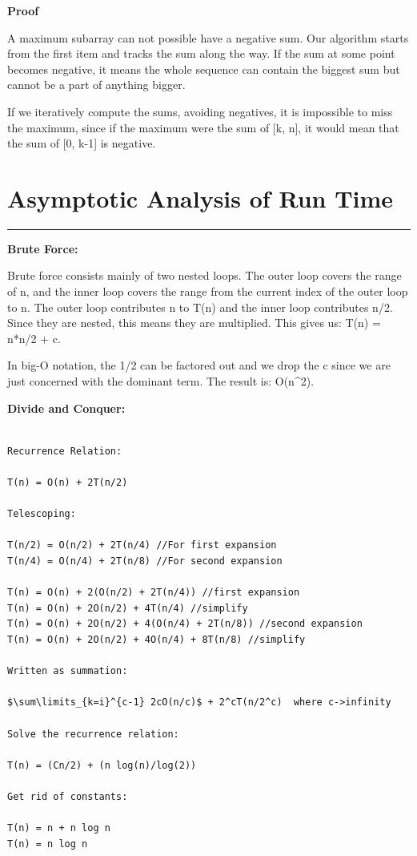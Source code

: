 \documentclass[letterpaper,10pt,titlepage,fleqn]{article}
\begin{document}

\textbf{Proof}

A maximum subarray can not possible have a negative sum. Our algorithm starts from the first item and tracks the sum along the way. If the sum at some point becomes negative, it means the whole sequence can contain the biggest sum but cannot be a part of anything bigger.

If we iteratively compute the sums, avoiding negatives, it is impossible to miss the maximum, since if the maximum were the sum of [k, n], it would mean that the sum of [0, k-1] is negative.

\section*{Asymptotic Analysis of Run Time}
\hrule

\begin{centering}
\textbf{Brute Force:}
\end{centering}


Brute force consists mainly of two nested loops. The outer loop covers the range of n, and the inner loop covers the range from the current index of the outer loop to n. The outer loop contributes n to T(n) and the inner loop contributes n/2. Since they are nested, this means they are multiplied. This gives us: T(n) = n*n/2 + c.

In big-O notation, the 1/2 can be factored out and we drop the c since we are just concerned with the dominant term. The result is: O(n^2).

\begin{centering}
\textbf{Divide and Conquer:}
\end{centering}


\begin{lstlisting}

Recurrence Relation:

T(n) = O(n) + 2T(n/2)

Telescoping:

T(n/2) = O(n/2) + 2T(n/4) //For first expansion
T(n/4) = O(n/4) + 2T(n/8) //For second expansion

T(n) = O(n) + 2(O(n/2) + 2T(n/4)) //first expansion
T(n) = O(n) + 2O(n/2) + 4T(n/4) //simplify
T(n) = O(n) + 2O(n/2) + 4(O(n/4) + 2T(n/8)) //second expansion
T(n) = O(n) + 2O(n/2) + 4O(n/4) + 8T(n/8) //simplify

Written as summation:

$\sum\limits_{k=i}^{c-1} 2cO(n/c)$ + 2^cT(n/2^c)  where c->infinity

Solve the recurrence relation:

T(n) = (Cn/2) + (n log(n)/log(2))

Get rid of constants:

T(n) = n + n log n
T(n) = n log n

\end{lstlisting}
\end{document}
